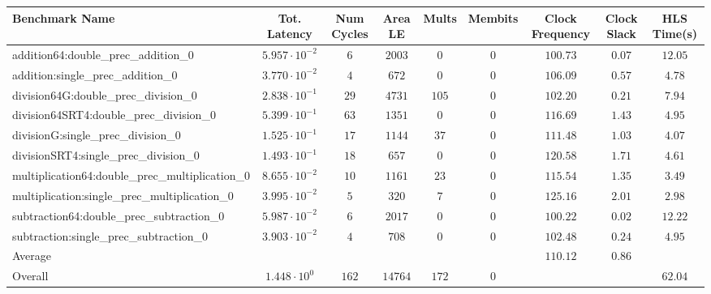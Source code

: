 \begin{tabular}{|l|c|c|c|c|c|c|c|c|}
\hline
Benchmark Name                                   & Tot. Latency            & Num Cycles & Area LE   & Mults   & Membits & Clock Frequency & Clock Slack & HLS Time(s) \\
\hline
addition64:double\_prec\_addition\_0             & $ 5.957 \cdot 10^{-2} $ & $ 6      $ & $ 2003  $ & $ 0   $ & $ 0   $ & $ 100.73      $ & $ 0.07    $ & $ 12.05   $ \\
addition:single\_prec\_addition\_0               & $ 3.770 \cdot 10^{-2} $ & $ 4      $ & $ 672   $ & $ 0   $ & $ 0   $ & $ 106.09      $ & $ 0.57    $ & $ 4.78    $ \\
division64G:double\_prec\_division\_0            & $ 2.838 \cdot 10^{-1} $ & $ 29     $ & $ 4731  $ & $ 105 $ & $ 0   $ & $ 102.20      $ & $ 0.21    $ & $ 7.94    $ \\
division64SRT4:double\_prec\_division\_0         & $ 5.399 \cdot 10^{-1} $ & $ 63     $ & $ 1351  $ & $ 0   $ & $ 0   $ & $ 116.69      $ & $ 1.43    $ & $ 4.95    $ \\
divisionG:single\_prec\_division\_0              & $ 1.525 \cdot 10^{-1} $ & $ 17     $ & $ 1144  $ & $ 37  $ & $ 0   $ & $ 111.48      $ & $ 1.03    $ & $ 4.07    $ \\
divisionSRT4:single\_prec\_division\_0           & $ 1.493 \cdot 10^{-1} $ & $ 18     $ & $ 657   $ & $ 0   $ & $ 0   $ & $ 120.58      $ & $ 1.71    $ & $ 4.61    $ \\
multiplication64:double\_prec\_multiplication\_0 & $ 8.655 \cdot 10^{-2} $ & $ 10     $ & $ 1161  $ & $ 23  $ & $ 0   $ & $ 115.54      $ & $ 1.35    $ & $ 3.49    $ \\
multiplication:single\_prec\_multiplication\_0   & $ 3.995 \cdot 10^{-2} $ & $ 5      $ & $ 320   $ & $ 7   $ & $ 0   $ & $ 125.16      $ & $ 2.01    $ & $ 2.98    $ \\
subtraction64:double\_prec\_subtraction\_0       & $ 5.987 \cdot 10^{-2} $ & $ 6      $ & $ 2017  $ & $ 0   $ & $ 0   $ & $ 100.22      $ & $ 0.02    $ & $ 12.22   $ \\
subtraction:single\_prec\_subtraction\_0         & $ 3.903 \cdot 10^{-2} $ & $ 4      $ & $ 708   $ & $ 0   $ & $ 0   $ & $ 102.48      $ & $ 0.24    $ & $ 4.95    $ \\
\hline
Average                                          & $                     $ & $        $ & $       $ & $     $ & $     $ & $ 110.12      $ & $ 0.86    $ & $         $ \\
\hline
Overall                                          & $ 1.448 \cdot 10^{0}  $ & $ 162    $ & $ 14764 $ & $ 172 $ & $ 0   $ & $             $ & $         $ & $ 62.04   $ \\
\hline
\end{tabular}

